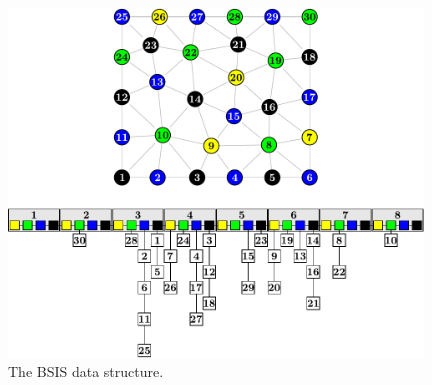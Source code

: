 \documentclass{elsart}
\begin{document}
\begin{figure}
  \begin{center}
    \includegraphics[width=0.98\textwidth]{images/BSIS/initial}
    \caption{The BSIS data structure.}
    \label{5:fig:bucket-algorithm}
  \end{center}
\end{figure}
\end{document}

